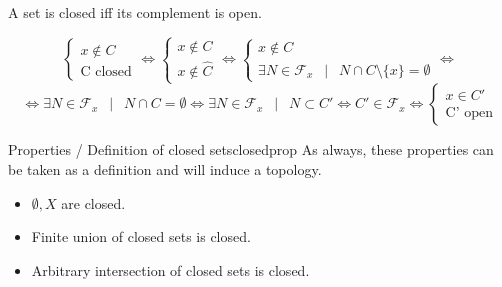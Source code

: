 \begin{mystatement} 
	A set is closed iff its complement is open.
\end{mystatement}
\begin{myproof}
\begin{equation*}
	\begin{cases} 
		x \notin C\\
		\textrm{C closed}
	\end{cases}
	\iff
	\begin{cases} 
		x \notin C\\
		x \notin \hat{C}
	\end{cases}
	\iff
	\begin{cases} 
		x \notin C\\
		\exists N \in \mathcal{F}_x  \enspace \mid \enspace N\cap C \setminus \{x\} = \emptyset{}
	\end{cases}
	\iff
\end{equation*}
\begin{equation*}
	\iff
	\exists N \in \mathcal{F}_x  \enspace \mid \enspace N\cap C = \emptyset{}
	\iff
	\exists N \in \mathcal{F}_x  \enspace \mid \enspace N \subset C'
	\iff
	C' \in \mathcal{F}_x 
	\iff
	\begin{cases} 
		x \in C' \\
		\textrm{C' open}
	\end{cases}
\end{equation*}
\end{myproof}
\begin{myprop}{Properties / Definition of closed sets}{closedprop}
	As always, these properties can be taken as a definition and will induce a topology.
	\begin{itemize}
		\item $\emptyset{}, X$ are closed.
		\item Finite union of closed sets is closed.
		\item Arbitrary intersection of closed sets is closed.
	\end{itemize}
\end{myprop}
\pagebreak
